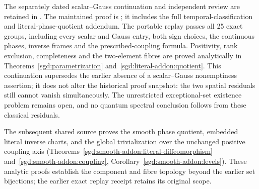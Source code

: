 The separately dated scalar--Gauss continuation and independent review are
retained in
.
The maintained proof is ; it includes
the full temporal-classification and literal-phase-quotient addendum.
The portable  replay passes all 25
exact groups, including every scalar and Gauss entry, both sign choices,
the continuous phases, inverse frames and the prescribed-coupling formula.
Positivity, rank exclusion, completeness and the two-element fibres are
proved analytically in Theorems~\ref{sgd:parametrization}
and~\ref{sgd:literal-addon:quotient}. This continuation supersedes the
earlier absence of a scalar--Gauss nonemptiness assertion; it does not
alter the historical proof snapshot: the two spatial residuals still
cannot vanish simultaneously.
The unrestricted exceptional-set existence problem remains open, and no
quantum spectral conclusion follows from these classical residuals.

The subsequent shared source 
proves the smooth phase quotient, embedded literal inverse charts, and
the global trivialization over the unchanged positive coupling axis
(Theorems~\ref{sgd:smooth-addon:literal-diffeomorphism}
and~\ref{sgd:smooth-addon:coupling},
Corollary~\ref{sgd:smooth-addon:levels}). These analytic proofs establish
the component and fibre topology beyond the earlier set bijections;
the earlier exact replay receipt retains its original scope.
